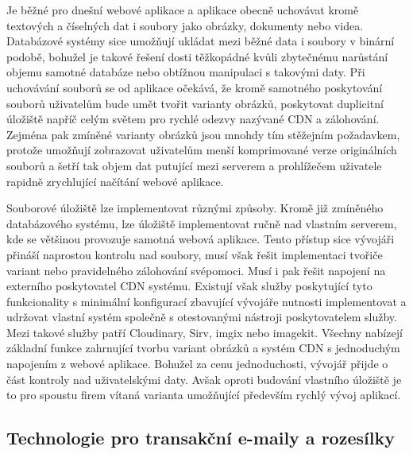 \begin{itemize}
\begin{itemize}
	Je běžné pro dnešní webové aplikace a aplikace obecně uchovávat kromě textových a číselných dat i soubory jako
	obrázky, dokumenty nebo videa.
	Databázové systémy sice umožňují ukládat mezi běžné data i soubory v binární podobě, bohužel je takové řešení dosti
	těžkopádné kvůli zbytečnému narůstání objemu samotné databáze nebo obtížnou manipulaci s takovými daty.
	Při uchovávání souborů se od aplikace očekává, že kromě samotného poskytování souborů uživatelům bude umět tvořit
	varianty obrázků, poskytovat duplicitní úložiště napříč celým světem pro rychlé odezvy nazývané \noindent\Ac{CDN} a zálohování.
	Zejména pak zmíněné varianty obrázků jsou mnohdy tím stěžejním požadavkem, protože umožňují zobrazovat uživatelům menší
	komprimované verze originálních souborů a šetří tak objem dat putující mezi serverem a prohlížečem uživatele rapidně
	zrychlující načítání webové aplikace.

	Souborové úložiště lze implementovat různými způsoby.
	Kromě již zmíněného databázového systému, lze úložiště implementovat ručně nad vlastním serverem, kde se většinou
	provozuje samotná webová aplikace.
	Tento přístup sice vývojáři přináší naprostou kontrolu nad soubory, musí však řešit implementaci tvořiče variant
	nebo pravidelného zálohování svépomoci.
	Musí i pak řešit napojení na externího poskytovatel \noindent\Ac{CDN} systému.
	Existují však služby poskytující tyto funkcionality s minimální konfigurací zbavující vývojáře nutnosti implementovat
	a udržovat vlastní systém společně s otestovanými nástroji poskytovatelem služby.
	Mezi takové služby patří Cloudinary, Sirv, imgix nebo imagekit.
	Všechny nabízejí základní funkce zahrnující tvorbu variant obrázků a systém \Ac{CDN} s jednoduchým napojením
	z webové aplikace.
	Bohužel za cenu jednoduchosti, vývojář přijde o část kontroly nad uživatelskými daty.
	Avšak oproti budování vlastního úložiště je to pro spoustu firem vítaná varianta umožňující především rychlý vývoj
	aplikací.

	\subsection{Technologie pro transakční e-maily a rozesílky}


\end{itemize}
\end{itemize}
